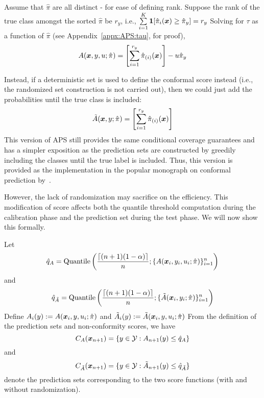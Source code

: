 Assume that $\hat{\pi}$ are all distinct - for ease of defining rank.
Suppose the rank of the true class amongst the sorted $\hat{\pi}$ be $r_y$, i.e., $\sum\limits_{i=1}^K \bm{1}[\hat{\pi}_i({\bm{x}}) \geq \hat{\pi}_{y}] = r_y$
Solving for $\tau$ as a function of $\hat{\pi}$  (see Appendix~\ref{appx:APS:tau}, for proof),
\begin{align}
A({\bm{x}}, y, u;\hat{\pi}) = \left[ \sum\limits_{i=1}^{r_y} \hat{\pi}_{(i)}({\bm{x}}) \right] - u \hat{\pi}_{y}
\end{align}

Instead, if a deterministic set is used to define the conformal score instead (i.e., the randomized set construction is not carried out), then we could just add the probabilities until the true class is included:
\begin{align}
    \Tilde{A}({\bm{x}}, y;\hat{\pi}) = \left[ \sum\limits_{i=1}^{r_y} \hat{\pi}_{(i)}({\bm{x}}) \right]
\end{align}
This version of APS still provides the same conditional coverage guarantees and has a simpler exposition as the prediction sets are constructed by greedily including the classes until the true label is included.
 Thus, this version is provided as the implementation in the popular monograph on conformal prediction by~\citet{angelopoulos2021gentle, angelopoulos2023conformal}.

However, the lack of randomization may sacrifice on the efficiency. 
This modification of score affects both the quantile threshold computation during the calibration phase and the prediction set during the test phase.
We will now show this formally.

Let 
\[
    \hat{q}_{A} = \text{Quantile}\left(\frac{\lceil(n+1)(1-\alpha)\rceil}{n}; \{A({\bm{x}}_i, y_i, u_i; \hat{\pi})\}_{i=1}^{n}\right)
\]
and
\[
    \hat{q}_{\Tilde{A}} = \text{Quantile}\left(\frac{\lceil(n+1)(1-\alpha)\rceil}{n}; \{\Tilde{A}({\bm{x}}_i, y_i; \hat{\pi})\}_{i=1}^{n}\right)
\]
Define $A_i(y) := A({\bm{x}}_i, y, u_i; \hat{\pi})$ and $\Tilde{A}_i(y) := \Tilde{A}({\bm{x}}_i, y, u_i; \hat{\pi})$
From the definition of the prediction sets and non-conformity scores, we have 
\[
    C_A({\bm{x}}_{n+1}) = \{y \in {\mathcal{Y}}: A_{n+1}(y) \leq \hat{q}_{A}\}
\] and 
\[
    C_{\Tilde{A}}({\bm{x}}_{n+1}) = \{y \in {\mathcal{Y}}: \Tilde{A}_{n+1}(y) \leq \hat{q}_{\Tilde{A}}\}
\] 
denote the prediction sets corresponding to the two score functions (with and without randomization).

